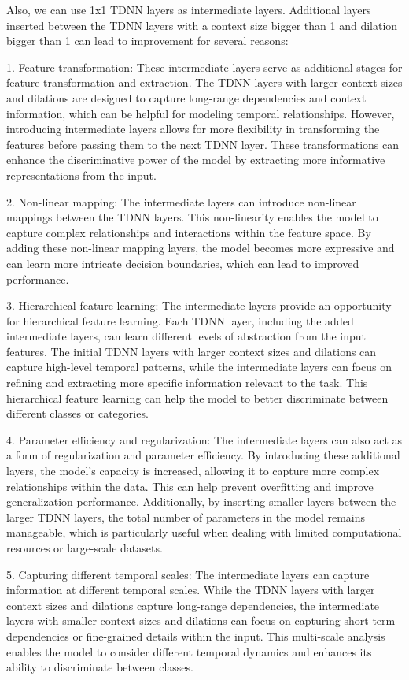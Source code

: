 \documentclass[a4paper]{article}
\begin{document}
Also, we can use 1x1 TDNN layers as intermediate layers. Additional layers inserted between the TDNN layers with a context size bigger than 1 and dilation bigger than 1 can lead to improvement for several reasons:

1. Feature transformation: These intermediate layers serve as additional stages for feature transformation and extraction. The TDNN layers with larger context sizes and dilations are designed to capture long-range dependencies and context information, which can be helpful for modeling temporal relationships. However, introducing intermediate layers allows for more flexibility in transforming the features before passing them to the next TDNN layer. These transformations can enhance the discriminative power of the model by extracting more informative representations from the input.

2. Non-linear mapping: The intermediate layers can introduce non-linear mappings between the TDNN layers. This non-linearity enables the model to capture complex relationships and interactions within the feature space. By adding these non-linear mapping layers, the model becomes more expressive and can learn more intricate decision boundaries, which can lead to improved performance.

3. Hierarchical feature learning: The intermediate layers provide an opportunity for hierarchical feature learning. Each TDNN layer, including the added intermediate layers, can learn different levels of abstraction from the input features. The initial TDNN layers with larger context sizes and dilations can capture high-level temporal patterns, while the intermediate layers can focus on refining and extracting more specific information relevant to the task. This hierarchical feature learning can help the model to better discriminate between different classes or categories.

4. Parameter efficiency and regularization: The intermediate layers can also act as a form of regularization and parameter efficiency. By introducing these additional layers, the model's capacity is increased, allowing it to capture more complex relationships within the data. This can help prevent overfitting and improve generalization performance. Additionally, by inserting smaller layers between the larger TDNN layers, the total number of parameters in the model remains manageable, which is particularly useful when dealing with limited computational resources or large-scale datasets.

5. Capturing different temporal scales: The intermediate layers can capture information at different temporal scales. While the TDNN layers with larger context sizes and dilations capture long-range dependencies, the intermediate layers with smaller context sizes and dilations can focus on capturing short-term dependencies or fine-grained details within the input. This multi-scale analysis enables the model to consider different temporal dynamics and enhances its ability to discriminate between classes.
\end{document}
